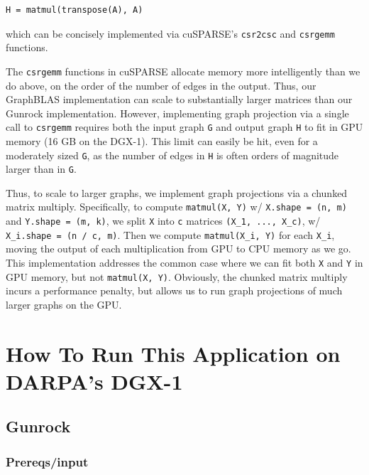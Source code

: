 \documentclass[10pt,oneside]{memoir}
\begin{document}
\begin{verbatim}
H = matmul(transpose(A), A)
\end{verbatim}

which can be concisely implemented via cuSPARSE's \texttt{csr2csc} and
\texttt{csrgemm} functions.

The \texttt{csrgemm} functions in cuSPARSE allocate memory more
intelligently than we do above, on the order of the number of edges in
the output. Thus, our GraphBLAS implementation can scale to
substantially larger matrices than our Gunrock implementation. However,
implementing graph projection via a single call to \texttt{csrgemm}
requires both the input graph \texttt{G} and output graph \texttt{H} to
fit in GPU memory (16 GB on the DGX-1). This limit can easily be hit,
even for a moderately sized \texttt{G}, as the number of edges in
\texttt{H} is often orders of magnitude larger than in \texttt{G}.

Thus, to scale to larger graphs, we implement graph projections via a
chunked matrix multiply. Specifically, to compute \texttt{matmul(X,\ Y)}
w/ \texttt{X.shape\ =\ (n,\ m)} and \texttt{Y.shape\ =\ (m,\ k)}, we
split \texttt{X} into \texttt{c} matrices \texttt{(X\_1,\ ...,\ X\_c)},
w/ \texttt{X\_i.shape\ =\ (n\ /\ c,\ m)}. Then we compute
\texttt{matmul(X\_i,\ Y)} for each \texttt{X\_i}, moving the output of
each multiplication from GPU to CPU memory as we go. This implementation
addresses the common case where we can fit both \texttt{X} and
\texttt{Y} in GPU memory, but not \texttt{matmul(X,\ Y)}. Obviously, the
chunked matrix multiply incurs a performance penalty, but allows us to
run graph projections of much larger graphs on the GPU.

\hypertarget{how-to-run-this-application-on-darpas-dgx-1-6}{%
\section{How To Run This Application on DARPA's
DGX-1}\label{how-to-run-this-application-on-darpas-dgx-1-6}}

\hypertarget{gunrock-1}{%
\subsection{Gunrock}\label{gunrock-1}}

\hypertarget{prereqsinput-5}{%
\subsubsection{Prereqs/input}\label{prereqsinput-5}}
\end{document}
